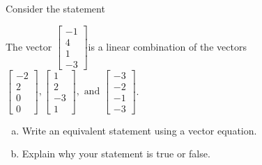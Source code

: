 
\begin{exerciseStatement}


Consider the statement 
\begin{center}\begin{minipage}{0.8\textwidth}
 The vector \( \left[\begin{array}{c}
-1 \\
4 \\
1 \\
-3
\end{array}\right] \)is a linear combination of the vectors \( \left[\begin{array}{c}
-2 \\
2 \\
0 \\
0
\end{array}\right] , \left[\begin{array}{c}
1 \\
2 \\
-3 \\
1
\end{array}\right] , \text{ and } \left[\begin{array}{c}
-3 \\
-2 \\
-1 \\
-3
\end{array}\right] \). 
\end{minipage}\end{center}
    


\begin{enumerate}[(a)]
\item  Write an equivalent statement using a vector equation.
\item  Explain why your statement is true or false.
\end{enumerate}
    
\end{exerciseStatement}
    
